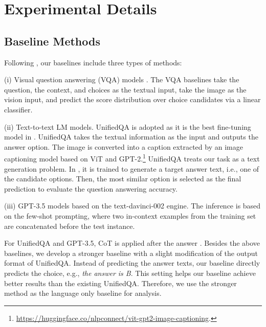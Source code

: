 \documentclass[nohyperref]{article}
\theoremstyle{plain}
\theoremstyle{definition}
\theoremstyle{remark}
\begin{document}
\section{Experimental Details}

\subsection{Baseline Methods}\label{app-sec:baseline}
Following \citet{lu2022learn}, our baselines include three types of methods: 

(i) Visual question answering (VQA) models \citep{yu2019mcan,Anderson2017up,Kim2018,gao2019dynamic,lu2021iconqa,li2019visualbert}. The VQA baselines take the question, the context, and choices as the textual input, take the image as the vision input, and predict the score distribution over choice
candidates via a linear classifier.

(ii) Text-to-text LM models. UnifiedQA \citep{khashabi2020unifiedqa} is adopted as it is the best fine-tuning model in \citet{lu2022learn}. UnifiedQA takes the textual information as the input and outputs the answer option. The image is converted into a caption extracted by an image captioning
model based on ViT and GPT-2.\footnote{\url{https://huggingface.co/nlpconnect/vit-gpt2-image-captioning}.} UnifiedQA treats our task as a text generation problem. In \citet{lu2022learn}, it is trained to generate a target answer text, i.e., one of the candidate options. Then, the most similar option is selected
as the final prediction to evaluate the question answering accuracy.

(iii) GPT-3.5 models \citep{chen2020big} based on the text-davinci-002 engine. The inference is based on the few-shot prompting, where two in-context examples from the training set are concatenated before the test instance.

For UnifiedQA and GPT-3.5, CoT is applied after the answer \citep{lu2022learn}. Besides the above baselines, we develop a stronger baseline with a slight modification of the output format of UnifiedQA. Instead of predicting the answer texts, our baseline directly predicts the choice, e.g., \textit{the answer is B}. This setting helps our baseline achieve better results than the existing UnifiedQA. Therefore, we use the stronger method as the language only baseline for analysis. 
\end{document}
